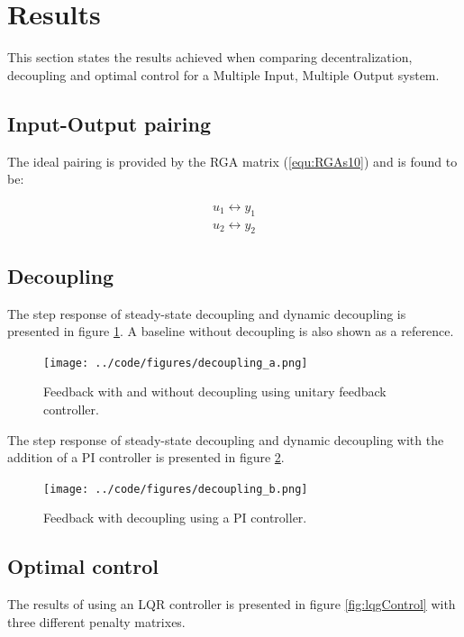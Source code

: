 \documentclass[a4paper, titlepage]{article}
\begin{document}
\section{Results}
This section states the results achieved when comparing decentralization, decoupling and optimal control for a Multiple Input, Multiple Output system.

\subsection{Input-Output pairing}
The ideal pairing is provided by the RGA matrix (\ref{equ:RGAs10}) and is found to be:

\begin{equation}
\begin{split}
u_1 \leftrightarrow y_1 \\
u_2 \leftrightarrow y_2
\end{split}
\label{equ:RGApairing}
\end{equation}

\subsection{Decoupling}

The step response of steady-state decoupling and dynamic decoupling is presented in figure \ref{fig:decouplingA}.  A baseline without decoupling is also shown as a reference.

\begin{figure}[H]
\center
\texttt{[image: ../code/figures/decoupling\_a.png]}
\caption{Feedback with and without decoupling using unitary feedback controller.}
\label{fig:decouplingA}
\end{figure}

The step response of steady-state decoupling and dynamic decoupling with the addition of a PI controller is presented in figure \ref{fig:decouplingB}.

\begin{figure}[H]
\center
\texttt{[image: ../code/figures/decoupling\_b.png]}
\caption{Feedback with decoupling using a PI controller.}
\label{fig:decouplingB}
\end{figure}



\subsection{Optimal control}

The results of using an LQR controller is presented in figure \ref{fig:lqgControl} with three different penalty matrixes. 
\end{document}
